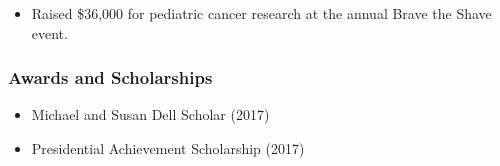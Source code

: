 \documentclass[]{article}
\providecommand{\tightlist}{%
  \setlength{\itemsep}{0pt}\setlength{\parskip}{0pt}}
\begin{document}
\begin{itemize}
\tightlist
\item
  Raised \$36,000 for pediatric cancer research at the annual Brave the
  Shave event.
\end{itemize}

\subsubsection{Awards and Scholarships}\label{awards-and-scholarships}

\begin{itemize}
\tightlist
\item
  Michael and Susan Dell Scholar (2017)
\item
  Presidential Achievement Scholarship (2017)
\end{itemize}
\end{document}
